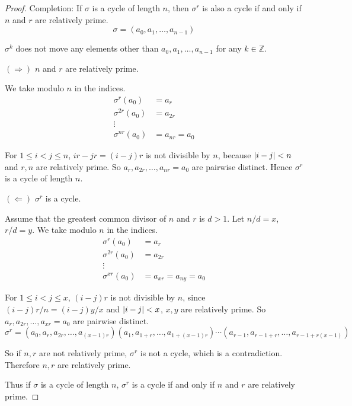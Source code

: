 \begin{proof}
    Completion: If $\sigma$ is a cycle of length $n$, then $\sigma^{r}$ is also a cycle if and only if $n$ and $r$ are relatively prime.
    \[
        \sigma = (a_{0}, a_{1}, \ldots, a_{n-1})
    \]

    $\sigma^{k}$ does not move any elements other than $a_{0}, a_{1}, \ldots, a_{n-1}$ for any $k\in\mathbb{Z}$.

    $(\Rightarrow)$ $n$ and $r$ are relatively prime.

    We take modulo $n$ in the indices.
    \begin{align*}
        \sigma^{r}(a_{0})  & = a_{r}          \\
        \sigma^{2r}(a_{0}) & = a_{2r}         \\
        \vdots                                \\
        \sigma^{nr}(a_{0}) & = a_{nr} = a_{0}
    \end{align*}

    For $1\leq i < j \leq n$, $ir - jr = (i - j)r$ is not divisible by $n$, because $\left\vert{i - j}\right\vert < n$ and $r, n$ are relatively prime. So $a_{r}, a_{2r}, \ldots, a_{nr} = a_{0}$ are pairwise distinct. Hence $\sigma^{r}$ is a cycle of length $n$.

    $(\Leftarrow)$ $\sigma^{r}$ is a cycle.

    Assume that the greatest common divisor of $n$ and $r$ is $d > 1$. Let $n/d = x$, $r/d = y$. We take modulo $n$ in the indices.
    \begin{align*}
        \sigma^{r}(a_{0})  & = a_{r}                   \\
        \sigma^{2r}(a_{0}) & = a_{2r}                  \\
        \vdots                                         \\
        \sigma^{xr}(a_{0}) & = a_{xr} = a_{ny} = a_{0}
    \end{align*}

    For $1\leq i < j \leq x$, $(i - j)r$ is not divisible by $n$, since $(i - j)r/n = (i - j)y/x$ and $\left\vert{i - j}\right\vert < x$, $x, y$ are relatively prime. So $a_{r}, a_{2r}, \ldots, a_{xr} = a_{0}$ are pairwise distinct.
    \[
        \sigma^{r} = (a_{0}, a_{r}, a_{2r}, \ldots, a_{(x-1)r})(a_{1}, a_{1+r}, \ldots, a_{1+(x-1)r})\cdots (a_{r-1}, a_{r-1+r}, \ldots, a_{r-1+r(x-1)})
    \]

    So if $n, r$ are not relatively prime, $\sigma^{r}$ is not a cycle, which is a contradiction. Therefore $n, r$ are relatively prime.

    Thus if $\sigma$ is a cycle of length $n$, $\sigma^{r}$ is a cycle if and only if $n$ and $r$ are relatively prime.
\end{proof}

